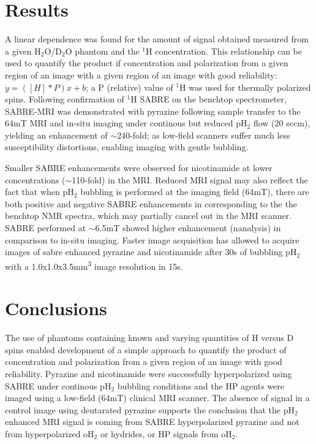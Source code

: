 \documentclass[final,3p,times,twocolumn]{elsarticle}
\begin{document}
\section{Results}
A linear dependence was found for the amount of signal obtained measured from a given H$_{\mathrm{2}}$O/D$_{\mathrm{2}}$O phantom and the $^{\mathrm{1}}$H concentration. This relationship can be used to quantify the product if concentration and polarization from a given region of an image with a given region of an image with good reliability: $y=( [H]*P )x+b$; a P (relative) value of $^{\mathrm{1}}$H was used for thermally polarized spins. Following confirmation of $^{\mathrm{1}}$H SABRE on the benchtop spectrometer, SABRE-MRI was demonstrated with pyrazine following sample transfer to the 64mT MRI and in-situ imaging under continous but reduced pH$_{\mathrm{2}}$ flow (20 sccm), yielding an enhancement of $\sim$240-fold; as low-field scanners suffer much less susceptibility distortions, enabling imaging with gentle bubbling. 
\par Smaller SABRE enhancements were observed for nicotinamide at lower concentrations ($\sim$110-fold) in the MRI. Reduced MRI signal may also reflect the fact that when pH$_{\mathrm{2}}$ bubbling is performed at the imaging field (64mT), there are both positive and negative SABRE enhancements in corresponding to the the benchtop NMR spectra, which may partially cancel out in the MRI scanner. 
SABRE performed at $\sim$6.5mT showed higher enhancement (nanalysis) in comparison to in-situ imaging. Faster image acquisition has allowed to acquire images of sabre enhanced pyrazine and nicotinamide after 30s of bubbling pH$_{\mathrm{2}}$ with a 1.0x1.0x3.5mm\textsuperscript{3} image resolution in 15s.
\section{Conclusions}
The use of phantoms containing known and varying quantities of H versus D spins enabled development of a simple approach to quantify the product of concentration and polarization from a given region of an image with good reliability. Pyrazine and nicotinamide were successfully hyperpolarized using SABRE under continous pH$_{\mathrm{2}}$ bubbling conditions and the HP agents were imaged using a low-field (64mT) clinical MRI scanner. 
The absence of signal in a control image using deutarated pyrazine supports the conclusion that the pH$_{\mathrm{2}}$ enhanced MRI signal is coming from SABRE hyperpolarized pyrazine and not from hyperpolarized oH$_{\mathrm{2}}$ or hydrides, or HP signals from oH$_{\mathrm{2}}$.
\end{document}
